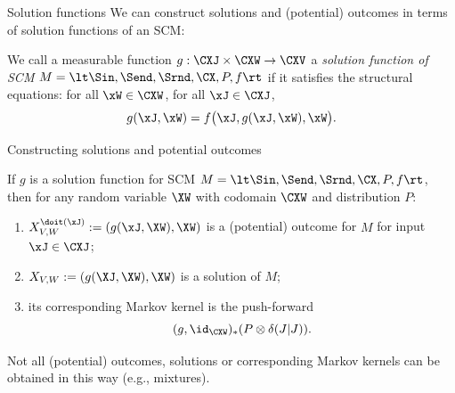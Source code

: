\begin{frame}{Solution functions}
We can construct solutions and (potential) outcomes in terms of solution functions of an SCM:
  \begin{Def}[\ref{def:scm_solution_functions}]
  We call a measurable function
    $g : \CXJ \times \CXW \to \CXV$ a \emph{solution function of SCM} $M = \lt \Sin, \Send, \Srnd, \CX, P, f \rt$ if it satisfies the structural equations:
  for all $\xW\in\CXW$, for all $\xJ\in\CXJ$,
  $$g(\xJ,\xW) = f\big(\xJ, g(\xJ,\xW), \xW\big).$$
\end{Def}
\end{frame}

\begin{frame}{Constructing solutions and potential outcomes}
  \begin{Rem}[\ref{rem:using_solution_functions}]
  If $g$ is a solution function for SCM $M = \lt \Sin, \Send, \Srnd, \CX, P, f \rt$,
  then for any random variable $\XW$ with codomain $\CXW$ and distribution $P$:
  \begin{enumerate}
    \item
      $X_{V,W}^{\doit(\xJ)} := (g(\xJ, \XW),\XW)$ is a (potential) outcome for $M$ for input $\xJ\in\CXJ$;
    \item
      $X_{V,W} := (g(\XJ, \XW),\XW)$ is a solution of $M$;
    \item its corresponding Markov kernel is the push-forward
      $$(g,\id_{\CXW})_* (P \otimes \delta(J|J)).$$
  \end{enumerate}
\end{Rem}
Not all (potential) outcomes, solutions or corresponding Markov kernels can be obtained in this way (e.g., mixtures).
\end{frame}

